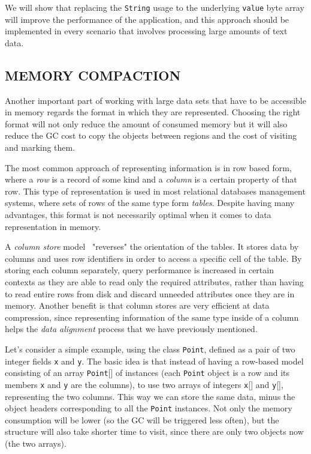 \documentclass[a4paper,twoside]{article}
\begin{document}
We will show that replacing the \texttt{String} usage to the underlying \texttt{value} byte array will improve the performance of the application, and this approach should be implemented in every scenario that involves processing large amounts of text data.


\subsection{\uppercase{Memory Compaction}}
\label{subsec:compaction}

Another important part of working with large data sets that have to be accessible in memory regards the format in which they are represented.
Choosing the right format will not only reduce the amount of consumed memory but it will also reduce the GC cost to copy the objects between regions and the cost of visiting and marking them.

The most common approach of representing information is in row based form, where a {\textit{row}} is a record of some kind and a {\textit{column}} is a certain property of that row.
This type of representation is used in most relational databases management systems, where sets of rows of the same type form {\textit{tables}}.
Despite having many advantages, this format is not necessarily optimal when it comes to data representation in memory.

A {\textit{column store}} model~\cite{abadi:2013} "reverses" the orientation of the tables.
It stores data by columns and uses row identifiers in order to access a specific cell of the table.
By storing each column separately, query performance is increased in certain contexts as they are able to read only the required attributes, rather than having to read entire rows from disk and discard unneeded attributes once they are in memory.
Another benefit is that column stores are very efficient at data compression, since representing information of the same type inside of a column helps the {\textit{data alignment}} process that we have previously mentioned.

Let's consider a simple example, using the class \texttt{Point}, defined as a pair of two integer fields \texttt{x} and \texttt{y}.
The basic idea is that instead of having a row-based model consisting of an array {\texttt{Point}[]} of instances (each {\texttt{Point}} object is a row and its members \texttt{x} and \texttt{y} are the columns), to use two arrays of integers {\texttt{x}[]} and {\texttt{y}[]}, representing the two columns.
This way we can store the same data, minus the object headers corresponding to all the {\texttt{Point}} instances.
Not only the memory consumption will be lower (so the GC will be triggered less often), but the structure will also take shorter time to visit, since there are only two objects now (the two arrays).
\end{document}
